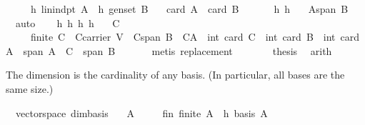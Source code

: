 \begin{isabellebody}
\ \ \ \ \ h{}{\isacharcolon}\ {\isachardoublequoteopen}lin{\isacharunderscore}indpt\ A{\isachardoublequoteclose}\ \ h{}{\isacharcolon}\ {\isachardoublequoteopen}gen{\isacharunderscore}set\ B{\isachardoublequoteclose}\isanewline
\ \ \ {\isachardoublequoteopen}card\ A\ {\isasymle}\ card\ B{\isachardoublequoteclose}\isanewline
%
\isadelimproof
%
\endisadelimproof
%
\isatagproof
{}\isamarkupfalse%
\ {\isacharminus}\ \isanewline
\ \ \isamarkupfalse%
\ h{}\ h{}\ \isamarkupfalse%
\ {}{\isacharcolon}\ {\isachardoublequoteopen}A{\isasymsubseteq}span\ B{\isachardoublequoteclose}\ \isamarkupfalse%
\ \ auto\isanewline
\ \ \isamarkupfalse%
\ h{}\ h{}\ h{}\ h{}\ {}\ \isamarkupfalse%
\ C\ \ \isanewline
\ \ \ \ {}{\isacharcolon}\ {\isachardoublequoteopen}finite\ C\ {\isasymand}\ C{\isasymsubseteq}carrier\ V\ {\isasymand}\ C{\isasymsubseteq}span\ B\ {\isasymand}\ C{\isasyminter}A{\isacharequal}{\isacharbraceleft}{\isacharbraceright}\ {\isasymand}\ int\ {\isacharparenleft}card\ C{\isacharparenright}\ {\isasymle}\ int\ {\isacharparenleft}card\ B{\isacharparenright}\ {\isacharminus}\ int\ {\isacharparenleft}card\ A{\isacharparenright}\ {\isasymand}\ {\isacharparenleft}span\ {\isacharparenleft}A\ {\isasymunion}\ C{\isacharparenright}\ {\isacharequal}\ span\ B{\isacharparenright}{\isachardoublequoteclose}\ \isanewline
\ \ \ \ \isamarkupfalse%
\ {\isacharparenleft}metis\ replacement{\isacharparenright}\ \isanewline
\ \ \isamarkupfalse%
\ {}\ \isamarkupfalse%
\ {\isacharquery}thesis\ \isamarkupfalse%
\ arith\isanewline
{}\isamarkupfalse%
%
\endisatagproof
{\isafoldproof}%
%
\isadelimproof
%
\endisadelimproof
%
\begin{isamarkuptext}%
The dimension is the cardinality of any basis. (In particular, all bases are the same size.)%
\end{isamarkuptext}%
\isamarkuptrue%
\isamarkupfalse%
\ {\isacharparenleft}\ vectorspace{\isacharparenright}\ dim{\isacharunderscore}basis{\isacharcolon}\isanewline
\ \ \ A\ \isanewline
\ \ \ \ fin{\isacharcolon}\ {\isachardoublequoteopen}finite\ A{\isachardoublequoteclose}\ \ h{}{\isacharcolon}\ {\isachardoublequoteopen}basis\ A{\isachardoublequoteclose}\isanewline

\end{isabellebody}
